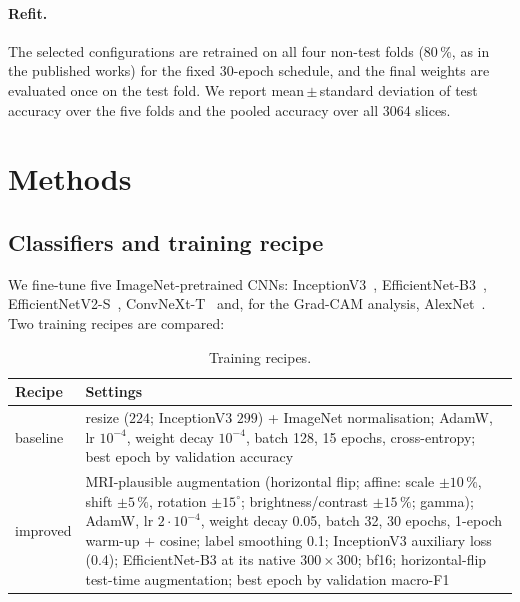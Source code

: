 \documentclass[11pt,a4paper]{article}
\begin{document}
\paragraph{Refit.} The selected configurations are retrained on all four non-test folds (80\,\%, as in the published
works) for the fixed 30-epoch schedule, and the final weights are evaluated once on the test fold. We report
mean\,$\pm$\,standard deviation of test accuracy over the five folds and the pooled accuracy over all 3064 slices.

\section{Methods}\label{sec:methods}

\subsection{Classifiers and training recipe}
We fine-tune five ImageNet-pretrained CNNs: InceptionV3~\cite{inception}, EfficientNet-B3~\cite{efficientnet},
EfficientNetV2-S~\cite{efficientnetv2}, ConvNeXt-T~\cite{convnext} and, for the Grad-CAM analysis,
AlexNet~\cite{alexnet}. Two training recipes are compared:

\begin{table}[H]
\centering\small
\caption{Training recipes.}
\label{tab:recipes}
\begin{tabular}{@{}lp{12.1cm}@{}}
\toprule
Recipe & Settings \\
\midrule
baseline & resize ($224$; InceptionV3 $299$) + ImageNet normalisation; AdamW, lr $10^{-4}$, weight decay $10^{-4}$, batch 128,
           15 epochs, cross-entropy; best epoch by validation accuracy \\
improved & MRI-plausible augmentation (horizontal flip; affine: scale $\pm10\,\%$, shift $\pm5\,\%$, rotation $\pm15^\circ$;
           brightness/contrast $\pm15\,\%$; gamma); AdamW, lr $2\cdot10^{-4}$, weight decay 0.05, batch 32, 30 epochs, 1-epoch
           warm-up + cosine; label smoothing 0.1; InceptionV3 auxiliary loss (0.4); EfficientNet-B3 at its native
           $300\times300$; bf16; horizontal-flip test-time augmentation; best epoch by validation macro-F1 \\
\bottomrule
\end{tabular}
\end{table}
\end{document}
